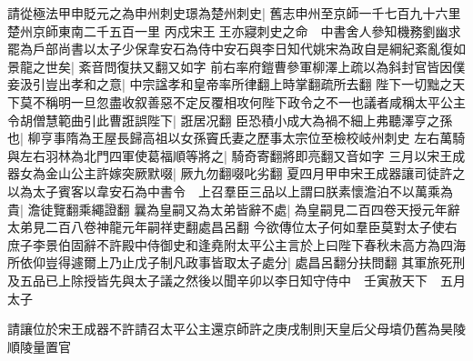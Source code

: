 請從極法甲申貶元之為申州刺史璟為楚州刺史|{
	舊志申州至京師一千七百九十六里楚州京師東南二千五百一里}
丙戍宋王王亦寢刺史之命　中書舍人參知機務劉幽求罷為戶部尚書以太子少保韋安石為侍中安石與李日知代姚宋為政自是綱紀紊亂復如景龍之世矣|{
	紊音問復扶又翻又如字}
前右率府鎧曹參軍柳澤上疏以為斜封官皆因僕妾汲引豈出孝和之意|{
	中宗諡孝和皇帝率所律翻上時掌翻疏所去翻}
陛下一切黜之天下莫不稱明一旦忽盡收叙善惡不定反覆相攻何陛下政令之不一也議者咸稱太平公主令胡僧慧範曲引此曹誑誤陛下|{
	誑居况翻}
臣恐積小成大為禍不細上弗聽澤亨之孫也|{
	柳亨事隋為王屋長歸高祖以女孫竇氏妻之歷事太宗位至檢校岐州刺史}
左右萬騎與左右羽林為北門四軍使葛福順等將之|{
	騎奇寄翻將即亮翻又音如字}
三月以宋王成器女為金山公主許嫁突厥默啜|{
	厥九勿翻啜叱劣翻}
夏四月甲申宋王成器讓司徒許之以為太子賓客以韋安石為中書令　上召羣臣三品以上謂曰朕素懷澹泊不以萬乘為貴|{
	澹徒覽翻乘繩證翻}
曩為皇嗣又為太弟皆辭不處|{
	為皇嗣見二百四卷天授元年辭太弟見二百八卷神龍元年嗣祥吏翻處昌呂翻}
今欲傳位太子何如羣臣莫對太子使右庶子李景伯固辭不許殿中侍御史和逢堯附太平公主言於上曰陛下春秋未高方為四海所依仰豈得遽爾上乃止戊子制凡政事皆取太子處分|{
	處昌呂翻分扶問翻}
其軍旅死刑及五品已上除授皆先與太子議之然後以聞辛卯以李日知守侍中　壬寅赦天下　五月太子

請讓位於宋王成器不許請召太平公主還京師許之庚戌制則天皇后父母墳仍舊為昊陵順陵量置官

